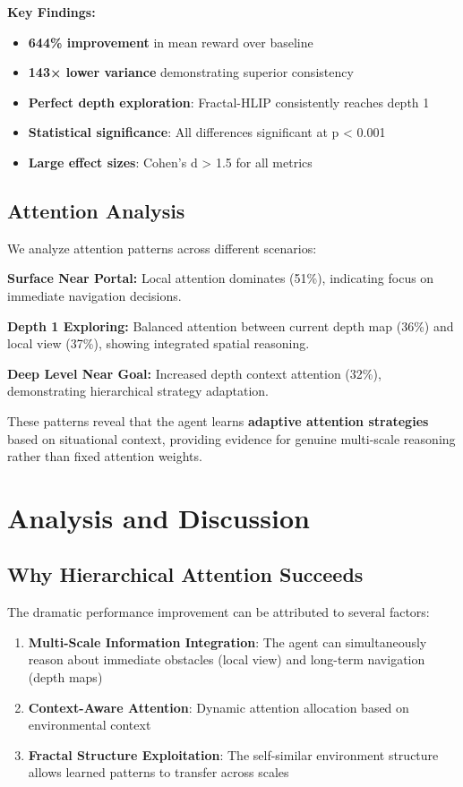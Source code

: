 \documentclass[11pt,a4paper]{article}
\begin{document}
\textbf{Key Findings:}
\begin{itemize}
    \item \textbf{644\% improvement} in mean reward over baseline
    \item \textbf{143× lower variance} demonstrating superior consistency
    \item \textbf{Perfect depth exploration}: Fractal-HLIP consistently reaches depth 1
    \item \textbf{Statistical significance}: All differences significant at p < 0.001
    \item \textbf{Large effect sizes}: Cohen's d > 1.5 for all metrics
\end{itemize}

\subsection{Attention Analysis}

We analyze attention patterns across different scenarios:

\textbf{Surface Near Portal:}
Local attention dominates (51\%), indicating focus on immediate navigation decisions.

\textbf{Depth 1 Exploring:}
Balanced attention between current depth map (36\%) and local view (37\%), showing integrated spatial reasoning.

\textbf{Deep Level Near Goal:}
Increased depth context attention (32\%), demonstrating hierarchical strategy adaptation.

These patterns reveal that the agent learns \textbf{adaptive attention strategies} based on situational context, providing evidence for genuine multi-scale reasoning rather than fixed attention weights.

\section{Analysis and Discussion}

\subsection{Why Hierarchical Attention Succeeds}

The dramatic performance improvement can be attributed to several factors:

\begin{enumerate}
    \item \textbf{Multi-Scale Information Integration}: The agent can simultaneously reason about immediate obstacles (local view) and long-term navigation (depth maps)
    \item \textbf{Context-Aware Attention}: Dynamic attention allocation based on environmental context
    \item \textbf{Fractal Structure Exploitation}: The self-similar environment structure allows learned patterns to transfer across scales
\end{enumerate}
\end{document}
